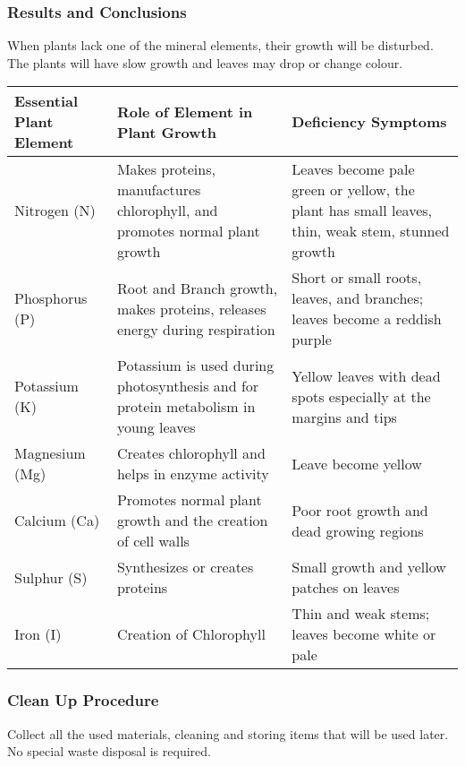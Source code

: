\subsubsection*{Results and Conclusions}
When plants lack one of the mineral elements, their growth will be disturbed. The plants will have slow growth and leaves may drop or change colour.

\begin{tabular}{|p{3.2cm}|p{4cm}|p{4.5cm}|}
\hline \textbf{Essential Plant Element} & \textbf{Role of Element in Plant Growth} & \textbf{Deficiency Symptoms} \\ 
\hline Nitrogen (N) & Makes proteins, manufactures chlorophyll, and promotes normal plant growth & Leaves become pale green or yellow, the plant has small leaves, thin, weak stem, stunned growth\\ 
\hline Phosphorus (P) & Root and Branch growth, makes proteins, releases energy during respiration & Short or small roots, leaves, and branches; leaves become a reddish purple \\ 
\hline Potassium (K) & Potassium is used during photosynthesis and for protein metabolism in young leaves & Yellow leaves with dead spots especially at the margins and tips \\ 
\hline Magnesium (Mg) & Creates chlorophyll and helps in enzyme activity & Leave become yellow \\ 
\hline Calcium (Ca) & Promotes normal plant growth and the creation of cell walls & Poor root growth and dead growing regions \\ 
\hline Sulphur (S) & Synthesizes or creates proteins & Small growth and yellow patches on leaves \\ 
\hline Iron (I) & Creation of Chlorophyll & Thin and weak stems; leaves become white or pale \\ 
\hline 
\end{tabular} 

\subsubsection*{Clean Up Procedure}
Collect all the used materials, cleaning and storing items that will be used later. No special waste disposal is required.

